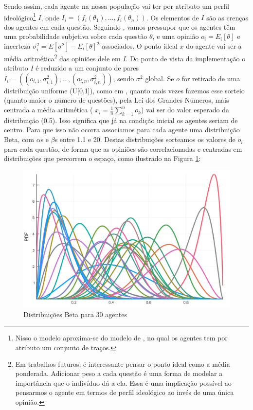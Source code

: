 Sendo assim, cada agente na nossa população vai ter por atributo um perfil
ideológico\footnote{Nisso o modelo aproxima-se do modelo de
  , no qual os agentes tem por atributo um
  conjunto de traços.} \(I\), onde \(I_i = (f_i(\theta_1), \ldots, f_i(\theta_n)) \). Os
elementos de \(I\) são as crenças dos agentes em cada questão. Seguindo
, vamos pressupor que os agentes têm uma
probabilidade subjetiva sobre cada questão \(\theta\), e uma opinião \( o_i =
E_i[\theta]\) e incerteza \( \sigma_i^2 = E[\sigma^2] - E_ i[\theta]^2\) associados. O ponto ideal
\(x\) do agente vai ser a média aritmética\footnote{Em trabalhos futuros, é
  interessante pensar o ponto ideal como a média ponderada. Adicionar peso a
  cada questão é uma forma de modelar a importância que o indivíduo dá a ela.
  Essa é uma implicação possível ao pensarmos o agente em termos de perfil
  ideológico ao invés de uma única opinião.} das opiniões dele em \(I\). Do
ponto de vista da implementação o atributo \(I\) é reduzido a um conjunto de
pares \(I_i = ((o_{i,1},\sigma_{i,1}^2), \ldots, (o_{i,n}, \sigma_{i,n}^2) )\), sendo \(\sigma^2\)
global. Se \(o\) for retirado de uma distribuição uniforme (U[0,1]), como em
, quanto mais vezes fazemos esse sorteio (quanto
maior o número de questões), pela Lei dos Grandes Números, mais centrada a média
aritmética ( \(x_i = \frac{1}{n}\sum_{k=1}^{n} o_k\)) vai ser do valor esperado da
distribuição (0.5). Isso significa que já na condição inicial os agentes seriam
de centro. Para que isso não ocorra associamos para cada agente uma distribuição
Beta, com \(\alpha\)s e \(\beta\)s entre 1.1 e 20. Destas distribuições sorteamos os
valores de \(o_i\) para cada questão, de forma que as opiniões são
correlacionadas e centradas em distribuições que percorrem o espaço, como
ilustrado na Figura \ref{fig:betas30}:

\begin{figure}[H]
  \centering
  \includegraphics[width=\textwidth]{ims/beta.png}
  \caption{Distribuições Beta para 30 agentes}
  \label{fig:betas30}
\end{figure}


